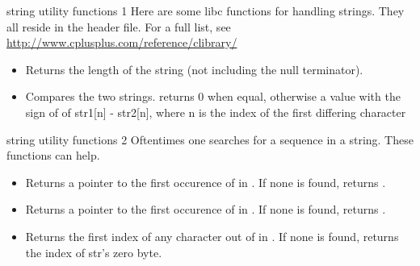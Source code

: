 \documentclass[10pt,graphics,aspectratio=169,table]{beamer}
\begin{document}
\begin{frame}[fragile]{string utility functions 1}
    Here are some libc functions for handling strings. 
    They all reside in the  header file.
    For a full list, see
    \url{http://www.cplusplus.com/reference/clibrary/}
    \begin{itemize}
        \item {}
    
        Returns the length of the string (not including the null terminator).
    
        \item {}
        
        Compares the two strings. returns 0 when equal, otherwise 
        a value with the sign of of str1[n] - str2[n], where n is the index 
        of the first differing character 
    \end{itemize}
\end{frame}
\begin{frame}[fragile]{string utility functions 2}
    Oftentimes one searches for a sequence in a string.
    These functions can help.
    \begin{itemize}
        \item {}
            
        Returns a pointer to the first occurence of  in .
        If none is found, returns .

        \item {}
        
        Returns a pointer to the first occurence of  in .
        If none is found, returns .

        \item {}
        
        Returns the first index of any character out of  
        in . If none is found, returns the index of str's zero byte.
    \end{itemize}
\end{frame}
\end{document}
